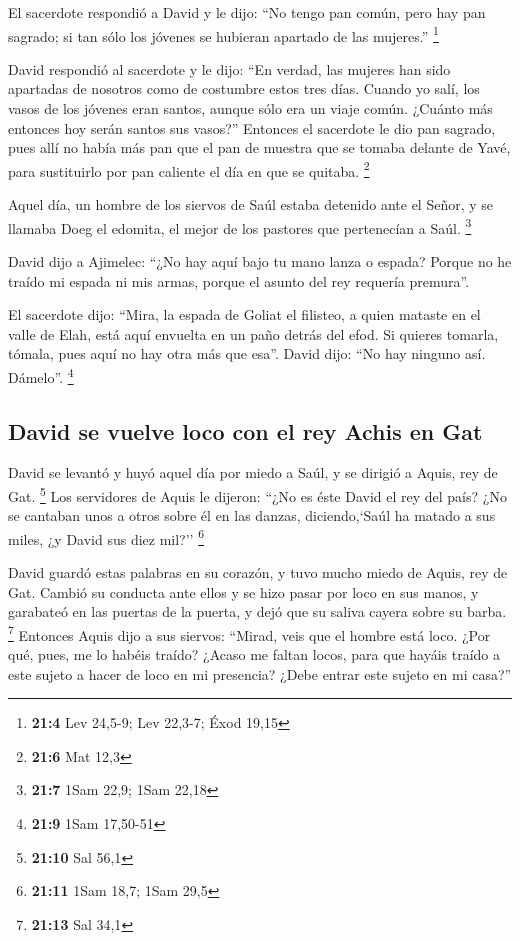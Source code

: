  El sacerdote respondió a David y le dijo: ``No tengo pan
común, pero hay pan sagrado; si tan sólo los jóvenes se hubieran
apartado de las mujeres.'' \footnote{\textbf{21:4} Lev 24,5-9; Lev
  22,3-7; Éxod 19,15}

 David respondió al sacerdote y le dijo: ``En verdad, las
mujeres han sido apartadas de nosotros como de costumbre estos tres
días. Cuando yo salí, los vasos de los jóvenes eran santos, aunque sólo
era un viaje común. ¿Cuánto más entonces hoy serán santos sus vasos?''
 Entonces el sacerdote le dio pan sagrado, pues allí no
había más pan que el pan de muestra que se tomaba delante de Yavé, para
sustituirlo por pan caliente el día en que se quitaba. \footnote{\textbf{21:6}
  Mat 12,3}

 Aquel día, un hombre de los siervos de Saúl estaba
detenido ante el Señor, y se llamaba Doeg el edomita, el mejor de los
pastores que pertenecían a Saúl. \footnote{\textbf{21:7} 1Sam 22,9; 1Sam
  22,18}

 David dijo a Ajimelec: ``¿No hay aquí bajo tu mano lanza
o espada? Porque no he traído mi espada ni mis armas, porque el asunto
del rey requería premura''.

 El sacerdote dijo: ``Mira, la espada de Goliat el
filisteo, a quien mataste en el valle de Elah, está aquí envuelta en un
paño detrás del efod. Si quieres tomarla, tómala, pues aquí no hay otra
más que esa''. David dijo: ``No hay ninguno así. Dámelo''. \footnote{\textbf{21:9}
  1Sam 17,50-51}

\hypertarget{david-se-vuelve-loco-con-el-rey-achis-en-gat}{%
\subsection{David se vuelve loco con el rey Achis en
Gat}\label{david-se-vuelve-loco-con-el-rey-achis-en-gat}}

 David se levantó y huyó aquel día por miedo a Saúl, y se
dirigió a Aquis, rey de Gat. \footnote{\textbf{21:10} Sal 56,1}
 Los servidores de Aquis le dijeron: ``¿No es éste David
el rey del país? ¿No se cantaban unos a otros sobre él en las danzas,
diciendo,`Saúl ha matado a sus miles, ¿y David sus diez mil?''
\footnote{\textbf{21:11} 1Sam 18,7; 1Sam 29,5}

 David guardó estas palabras en su corazón, y tuvo mucho
miedo de Aquis, rey de Gat.  Cambió su conducta ante
ellos y se hizo pasar por loco en sus manos, y garabateó en las puertas
de la puerta, y dejó que su saliva cayera sobre su barba. \footnote{\textbf{21:13}
  Sal 34,1}  Entonces Aquis dijo a sus siervos: ``Mirad,
veis que el hombre está loco. ¿Por qué, pues, me lo habéis traído?
 ¿Acaso me faltan locos, para que hayáis traído a este
sujeto a hacer de loco en mi presencia? ¿Debe entrar este sujeto en mi
casa?''

